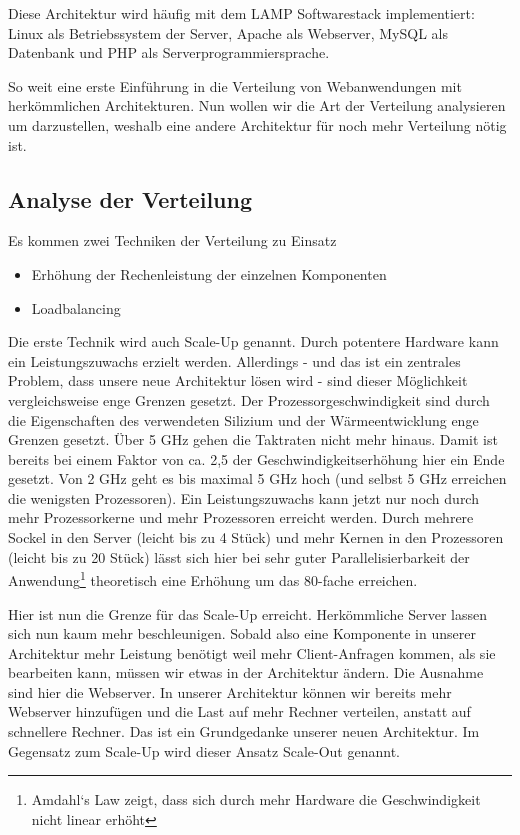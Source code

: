 Diese Architektur wird häufig mit dem LAMP Softwarestack implementiert: Linux als Betriebssystem der Server,
Apache als Webserver, MySQL als Datenbank und PHP als Serverprogrammiersprache.

So weit eine erste Einführung in die Verteilung von Webanwendungen mit herkömmlichen Architekturen.
Nun wollen wir die Art der Verteilung analysieren um darzustellen, weshalb eine andere Architektur für noch
mehr Verteilung nötig ist.

\subsection{Analyse der Verteilung}
Es kommen zwei Techniken der Verteilung zu Einsatz
\begin{itemize}
  \item Erhöhung der Rechenleistung der einzelnen Komponenten
  \item Loadbalancing
\end{itemize}

Die erste Technik wird auch Scale-Up genannt. Durch potentere Hardware kann ein Leistungszuwachs erzielt werden.
Allerdings - und das ist ein zentrales Problem, dass unsere neue Architektur lösen wird - sind dieser Möglichkeit
vergleichsweise enge Grenzen gesetzt. Der Prozessorgeschwindigkeit sind durch die Eigenschaften des verwendeten
Silizium und der Wärmeentwicklung enge Grenzen gesetzt. Über 5 GHz gehen die Taktraten nicht mehr hinaus.
Damit ist bereits bei einem Faktor von ca. 2,5 der Geschwindigkeitserhöhung hier ein Ende gesetzt. Von 2 GHz
geht es bis maximal 5 GHz hoch (und selbst 5 GHz erreichen die wenigsten Prozessoren). Ein Leistungszuwachs
kann jetzt nur noch durch mehr Prozessorkerne und mehr Prozessoren erreicht werden. Durch mehrere Sockel
in den Server (leicht bis zu 4 Stück) und mehr Kernen in den Prozessoren (leicht bis zu 20 Stück) lässt sich hier
bei sehr guter Parallelisierbarkeit der Anwendung\footnote{Amdahl‘s Law zeigt, dass sich durch mehr
Hardware die Geschwindigkeit nicht linear erhöht} theoretisch eine Erhöhung um das 80-fache erreichen.

Hier ist nun die Grenze für das Scale-Up erreicht. Herkömmliche Server lassen sich nun kaum mehr beschleunigen.
Sobald also eine Komponente in unserer Architektur mehr Leistung benötigt weil mehr Client-Anfragen kommen,
als sie bearbeiten kann, müssen wir etwas in der Architektur ändern. Die Ausnahme sind hier die Webserver.
In unserer Architektur können wir bereits mehr Webserver hinzufügen und die Last auf mehr Rechner verteilen,
anstatt auf schnellere Rechner. Das ist ein Grundgedanke unserer neuen Architektur. Im Gegensatz zum Scale-Up
wird dieser Ansatz Scale-Out genannt.


